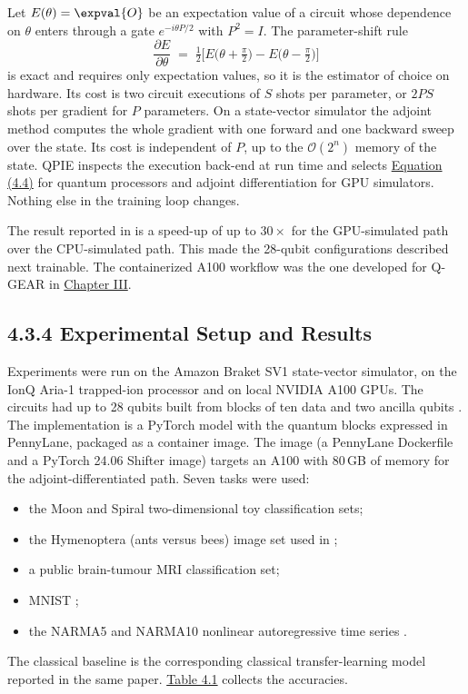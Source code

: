 \documentclass{report}
\theoremstyle{plain}
\theoremstyle{definition}
\theoremstyle{remark}
\newcommand{\bigO}[1]{\mathcal{O}\!\left(#1\right)}
\begin{document}
Let $E(\theta) = \expval{O}$ be an expectation value of a circuit whose dependence on $\theta$ enters through a gate $e^{-i\theta P/2}$ with $P^2 = I$. The parameter-shift rule \cite{crooks2019parametershift}
\hypertarget{eq:qml:paramshift}{}\[
\frac{\partial E}{\partial \theta} \;=\; \tfrac{1}{2}\Big[E\big(\theta + \tfrac{\pi}{2}\big) - E\big(\theta - \tfrac{\pi}{2}\big)\Big]
\tag{4.4}\]
is exact and requires only expectation values, so it is the estimator of choice on hardware. Its cost is two circuit executions of $S$ shots per parameter, or $2PS$ shots per gradient for $P$ parameters. On a state-vector simulator the adjoint method \cite{jones2020adjoint} computes the whole gradient with one forward and one backward sweep over the state. Its cost is independent of $P$, up to the $\bigO{2^n}$ memory of the state. QPIE inspects the execution back-end at run time and selects \hyperref[eq:qml:paramshift]{Equation (4.4)} for quantum processors and adjoint differentiation for GPU simulators. Nothing else in the training loop changes.

The result reported in \cite{guo2025qpie} is a speed-up of up to $30\times$ for the GPU-simulated path over the CPU-simulated path. This made the 28-qubit configurations described next trainable. The containerized A100 workflow was the one developed for Q-GEAR in \hyperref[ch:qgear]{Chapter III}.

\subsection{4.3.4 Experimental Setup and Results}\label{sec:qml:qpie:results}

Experiments were run on the Amazon Braket SV1 state-vector simulator, on the IonQ Aria-1 trapped-ion processor and on local NVIDIA A100 GPUs. The circuits had up to 28 qubits built from blocks of ten data and two ancilla qubits \cite{guo2025qpie}. The implementation is a PyTorch model with the quantum blocks expressed in PennyLane, packaged as a container image. The image (a PennyLane Dockerfile and a PyTorch 24.06 Shifter image) targets an A100 with 80 GB of memory for the adjoint-differentiated path. Seven tasks were used:
\begin{itemize}
\item the Moon and Spiral two-dimensional toy classification sets;
\item the Hymenoptera (ants versus bees) image set used in \cite{mari2020transferlearning};
\item a public brain-tumour MRI classification set;
\item MNIST \cite{lecun1998mnist};
\item the NARMA5 and NARMA10 nonlinear autoregressive time series \cite{atiya2000narma}.
\end{itemize}
The classical baseline is the corresponding classical transfer-learning model reported in the same paper. \hyperref[tab:qml:qpie-results]{Table 4.1} collects the accuracies.
\end{document}
